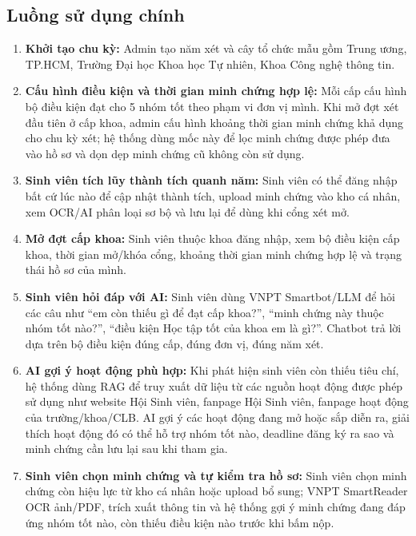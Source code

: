 \subsection{Luồng sử dụng chính}

\begin{enumerate}
    \item \textbf{Khởi tạo chu kỳ:} Admin tạo năm xét và cây tổ chức mẫu gồm Trung ương, TP.HCM, Trường Đại học Khoa học Tự nhiên, Khoa Công nghệ thông tin.

    \item \textbf{Cấu hình điều kiện và thời gian minh chứng hợp lệ:} Mỗi cấp cấu hình bộ điều kiện đạt cho 5 nhóm tốt theo phạm vi đơn vị mình. Khi mở đợt xét đầu tiên ở cấp khoa, admin cấu hình khoảng thời gian minh chứng khả dụng cho chu kỳ xét; hệ thống dùng mốc này để lọc minh chứng được phép đưa vào hồ sơ và dọn dẹp minh chứng cũ không còn sử dụng.

    \item \textbf{Sinh viên tích lũy thành tích quanh năm:} Sinh viên có thể đăng nhập bất cứ lúc nào để cập nhật thành tích, upload minh chứng vào kho cá nhân, xem OCR/AI phân loại sơ bộ và lưu lại để dùng khi cổng xét mở.

    \item \textbf{Mở đợt cấp khoa:} Sinh viên thuộc khoa đăng nhập, xem bộ điều kiện cấp khoa, thời gian mở/khóa cổng, khoảng thời gian minh chứng hợp lệ và trạng thái hồ sơ của mình.

    \item \textbf{Sinh viên hỏi đáp với AI:} Sinh viên dùng VNPT Smartbot/LLM để hỏi các câu như ``em còn thiếu gì để đạt cấp khoa?'', ``minh chứng này thuộc nhóm tốt nào?'', ``điều kiện Học tập tốt của khoa em là gì?''. Chatbot trả lời dựa trên bộ điều kiện đúng cấp, đúng đơn vị, đúng năm xét.

    \item \textbf{AI gợi ý hoạt động phù hợp:} Khi phát hiện sinh viên còn thiếu tiêu chí, hệ thống dùng RAG để truy xuất dữ liệu từ các nguồn hoạt động được phép sử dụng như website Hội Sinh viên, fanpage Hội Sinh viên, fanpage hoạt động của trường/khoa/CLB. AI gợi ý các hoạt động đang mở hoặc sắp diễn ra, giải thích hoạt động đó có thể hỗ trợ nhóm tốt nào, deadline đăng ký ra sao và minh chứng cần lưu lại sau khi tham gia.

    \item \textbf{Sinh viên chọn minh chứng và tự kiểm tra hồ sơ:} Sinh viên chọn minh chứng còn hiệu lực từ kho cá nhân hoặc upload bổ sung; VNPT SmartReader OCR ảnh/PDF, trích xuất thông tin và hệ thống gợi ý minh chứng đang đáp ứng nhóm tốt nào, còn thiếu điều kiện nào trước khi bấm nộp.


\end{enumerate}
